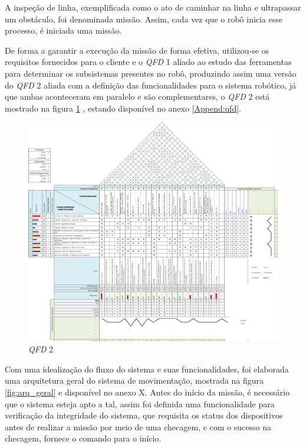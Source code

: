 A inspeção de linha, exemplificada como o ato de caminhar na linha e ultrapassar um obstáculo, foi denominada missão. Assim, cada vez que o robô inicia esse processo, é iniciada uma missão.

De forma a garantir a execução da missão de forma efetiva, utilizou-se os requisitos fornecidos para o cliente e o \textit{QFD} 1 aliado ao estudo das ferramentas para determinar os subsistemas presentes no robô, produzindo assim uma versão do \textit{QFD} 2 aliada com a definição das funcionalidades para o sistema robótico, já que ambas aconteceram em paralelo e são complementares, o \textit{QFD} 2 está mostrado na figura \ref{fig:qfd2} , estando disponível no anexo \ref{Append:qfd}.

\begin{figure}[H]
	\centering
	\includegraphics[scale=1]{Figures/qfdelir-2.png}
	\caption{\textit{QFD} 2}
	\label{fig:qfd2}
\end{figure}

Com uma idealização do fluxo do sistema e suas funcionalidades, foi elaborada uma arquitetura geral do sistema de movimentação, mostrada na figura \ref{fig:arq_geral} e disponível no anexo X.  Antes do início da missão, é necessário que o sistema esteja apto a tal, assim foi definida uma funcionalidade para verificação da integridade do sistema, que requisita os status dos dispositivos antes de realizar a missão por meio de uma checagem, e com o sucesso na checagem, fornece o comando para o início.

